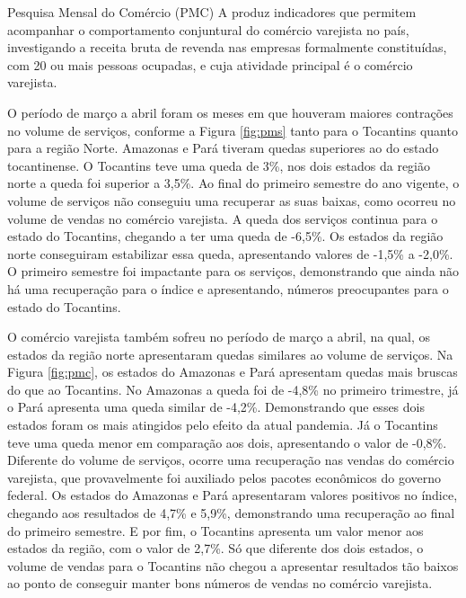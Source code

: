 \begin{smbox}[label={labelbox},nameref={Pesquisa Mensal do Comércio(PMC)}]{Pesquisa Mensal do Comércio (PMC)}
A  produz indicadores que permitem acompanhar o comportamento conjuntural do comércio varejista no país, investigando a receita bruta de revenda nas empresas formalmente constituídas, com 20 ou mais pessoas ocupadas, e cuja atividade principal é o comércio varejista.
\end{smbox}

\par O período de março a abril foram os meses em que houveram maiores contrações no volume de serviços, conforme a Figura \ref{fig:pms} tanto para o Tocantins quanto para a região Norte. Amazonas e Pará tiveram quedas superiores ao do estado tocantinense. O Tocantins teve uma queda de 3\%, nos dois estados da região norte a queda foi superior a 3,5\%. Ao final do primeiro semestre do ano vigente, o volume de serviços não conseguiu uma recuperar as suas baixas, como ocorreu no volume de vendas no comércio varejista. A queda dos serviços continua para o estado do Tocantins, chegando a ter uma queda de -6,5\%. Os estados da região norte conseguiram estabilizar essa queda, apresentando valores de -1,5\% a -2,0\%. O primeiro semestre foi impactante para os serviços, demonstrando que ainda não há uma recuperação para o índice e apresentando, números preocupantes para o estado do Tocantins.
\par O comércio varejista também sofreu no período de março a abril, na qual, os estados da região norte apresentaram quedas similares ao volume de serviços. Na Figura \ref{fig:pmc}, os estados do Amazonas e Pará apresentam quedas mais bruscas do que ao Tocantins. No Amazonas a queda foi de -4,8\% no primeiro trimestre, já o Pará apresenta uma queda similar de -4,2\%. Demonstrando que esses dois estados foram os mais atingidos pelo efeito da atual pandemia. Já o Tocantins teve uma queda menor em comparação aos dois, apresentando o valor de -0,8\%. Diferente do volume de serviços, ocorre uma recuperação nas vendas do comércio varejista, que provavelmente foi auxiliado pelos pacotes econômicos do governo federal. Os estados do Amazonas e Pará apresentaram valores positivos no índice, chegando aos resultados de 4,7\% e 5,9\%, demonstrando uma recuperação ao final do primeiro semestre. E por fim, o Tocantins apresenta um valor menor aos estados da região, com o valor de 2,7\%. Só que diferente dos dois estados, o volume de vendas para o Tocantins não chegou a apresentar resultados tão baixos ao ponto de conseguir manter bons números de vendas no comércio varejista.
